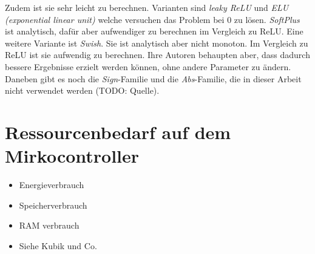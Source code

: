 Zudem ist sie sehr leicht zu berechnen.
Varianten sind \textit{leaky ReLU} und \textit{ELU (exponential linear unit)} welche versuchen das Problem bei 0 zu lösen.
\textit{SoftPlus} ist analytisch, dafür aber aufwendiger zu berechnen im Vergleich zu ReLU.
Eine weitere Variante ist \textit{Swish}. Sie ist analytisch aber nicht monoton.
Im Vergleich zu ReLU ist sie aufwendig zu berechnen.
Ihre Autoren behaupten aber, dass dadurch bessere Ergebnisse erzielt werden können, ohne andere Parameter zu ändern.
\newline
\newline
Daneben gibt es noch die \textit{Sign}-Familie und die \textit{Abs}-Familie, die in dieser Arbeit nicht verwendet werden (TODO: Quelle).

\section{Ressourcenbedarf auf dem Mirkocontroller}
\begin{itemize}
    \item Energieverbrauch
    \item Speicherverbrauch
    \item RAM verbrauch
    \item Siehe Kubik und Co.
\end{itemize}